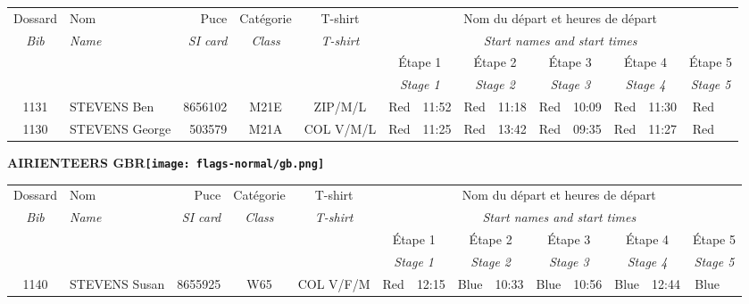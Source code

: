 \documentclass{report}
\begin{document}
  \begin{longtable}{|c|l|r|c|c|*{5}{cc|}}
    Dossard & Nom  & Puce    & Catégorie & T-shirt & \multicolumn{10}{c|}{Nom du départ et heures de départ} \\
    \itshape Bib     & \itshape Name & \itshape SI card & \itshape Class  & \itshape  T-shirt  & \multicolumn{10}{c|}{\itshape Start names and start times} \\
    \hline
    & & & & & \multicolumn{2}{c|}{Étape 1} & \multicolumn{2}{c|}{Étape 2} & \multicolumn{2}{c|}{Étape 3} & \multicolumn{2}{c|}{Étape 4} & \multicolumn{2}{c|}{Étape 5} \\
    & & & & & \multicolumn{2}{c|}{\itshape Stage 1} & \multicolumn{2}{c|}{\itshape Stage 2} & \multicolumn{2}{c|}{\itshape Stage 3} & \multicolumn{2}{c|}{\itshape Stage 4} & \multicolumn{2}{c|}{\itshape Stage 5} \\
    \hline
    1131 & STEVENS Ben & 8656102 & M21E & ZIP/M/L & Red & 11:52 & Red & 11:18 & Red & 10:09 & Red & 11:30 & Red &  \\
    1130 & STEVENS George & 503579 & M21A & COL V/M/L & Red & 11:25 & Red & 13:42 & Red & 09:35 & Red & 11:27 & Red &  \\
  \end{longtable}
\newpage
  \Huge \centering \bfseries AIRIENTEERS  GBR\normalfont \footnotesize \sffamily \hfill \texttt{[image: flags-normal/gb.png]} \newline 
  \begin{longtable}{|c|l|r|c|c|*{5}{cc|}}
    Dossard & Nom  & Puce    & Catégorie & T-shirt & \multicolumn{10}{c|}{Nom du départ et heures de départ} \\
    \itshape Bib     & \itshape Name & \itshape SI card & \itshape Class  & \itshape  T-shirt  & \multicolumn{10}{c|}{\itshape Start names and start times} \\
    \hline
    & & & & & \multicolumn{2}{c|}{Étape 1} & \multicolumn{2}{c|}{Étape 2} & \multicolumn{2}{c|}{Étape 3} & \multicolumn{2}{c|}{Étape 4} & \multicolumn{2}{c|}{Étape 5} \\
    & & & & & \multicolumn{2}{c|}{\itshape Stage 1} & \multicolumn{2}{c|}{\itshape Stage 2} & \multicolumn{2}{c|}{\itshape Stage 3} & \multicolumn{2}{c|}{\itshape Stage 4} & \multicolumn{2}{c|}{\itshape Stage 5} \\
    \hline
    1140 & STEVENS Susan & 8655925 & W65 & COL V/F/M & Red & 12:15 & Blue & 10:33 & Blue & 10:56 & Blue & 12:44 & Blue &  \\
  \end{longtable}
\end{document}
